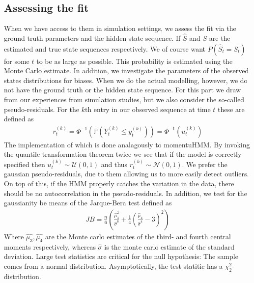 \subsection{Assessing the fit}
When we have access to them in simulation settings, we assess the fit via the ground truth parameters and the hidden state sequence. If $\hat{S}$ and $S$ are the estimated and true state sequences respectively. We of course want $P(\hat{S}_t = S_t)$ for some $t$ to be as large as possible. This probability is estimated using the Monte Carlo estimate. In addition, we investigate the parameters of the observed states distributions for biases. When we do the actual modelling, however, we do not have the ground truth or the hidden state sequence. For this part we draw from our experiences from simulation studies, but we also consider the so-called pseudo-residuals. For the $k$th entry in our observed sequence at time $t$ these are defined as \cite{HHMForTimesSeries}
\begin{align}
    r_t^{(k)} = \Phi^{-1}\left(\mathbb{P}\left(Y_t^{(k)} \leq y_t^{(k)}\right)\right) = \Phi^{-1}\left(u_t^{(k)}\right) \label{pseudoresidualsFormula}
\end{align}
The implementation of which is done analagously to momentuHMM. \cite{momentuHMM}
By invoking the quantile transformation theorem twice we see that if the model is correctly specified then $u_t^{(k)}\sim \mathcal{U}(0,1)$ and thus $r_t^{(k)}\sim\mathcal{N}\left(0,1\right)$. We prefer the gaussian pseudo-residuals, due to them allowing us to more easily detect outliers. On top of this, if the HMM properly catches the variation in the data, there should be no autocorrelation in the pseudo-residuals. \cite{HHMForTimesSeries} In addition, we test for the gaussianity be means of the Jarque-Bera test defined as
\begin{align}
    JB = \frac{n}{6}\left(\frac{\hat{\mu}_3^2}{\hat{\sigma}^6}+\frac{1}{4}\left(\frac{\hat{\mu}_4}{\hat{\sigma}^4}-3\right)^2\right)
\end{align}
Where $\hat{\mu_3}, \hat{\mu_4}$ are the Monte carlo estimates of the third- and fourth central moments respectively, whereas $\hat{\sigma}$ is the monte carlo estimate of the standard deviation. Large test statistics are critical for the null hypothesis: The sample comes from a normal distribution. Asymptotically, the test statitic has a $\chi_2^2$-distribution.\cite{tseries}
